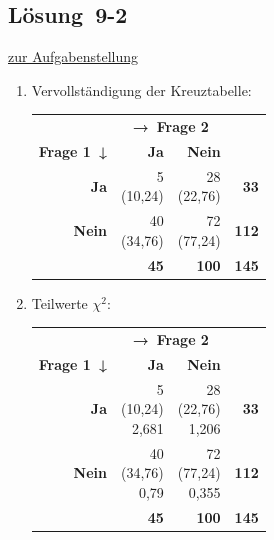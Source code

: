 \documentclass[
  11pt,
  ngerman,
  a4paper,
]{report}
\begin{document}
\hypertarget{loesung-9-2}{%
\subsection{Lösung~9-2}\label{loesung-9-2}}

\protect\hyperlink{aufgabe-9-2}{zur Aufgabenstellung}

\begin{enumerate}
\def\labelenumi{\alph{enumi})}
\item
  Vervollständigung der Kreuztabelle:

  \begin{table}[H]
   \centering
   \begin{tabular}{>{}r|r>{}r|>{}r}
   \toprule
   \multicolumn{1}{c}{\textbf{ }} & \multicolumn{2}{c}{\textbf{→ Frage 2}} & \multicolumn{1}{c}{\textbf{ }} \\
   \cmidrule(l{3pt}r{3pt}){2-3}
   \textbf{Frage 1 ↓} & \textbf{Ja} & \textbf{Nein} & \textbf{  }\\
   \midrule
   \textbf{Ja} & \makecell[tr]{5\\(10,24)} & \makecell[tr]{28\\(22,76)} & \textbf{33}\\
   \textbf{Nein} & \makecell[tr]{40\\(34,76)} & \makecell[tr]{72\\(77,24)} & \textbf{112}\\
   \midrule
   \textbf{\textbf{}} & \textbf{45} & \textbf{100} & \textbf{\textbf{145}}\\
   \bottomrule
   \end{tabular}
   \end{table}
\item
  Teilwerte \(\chi^2\):

  \begin{table}[H]
   \centering
   \begin{tabular}{>{}r|r>{}r|>{}r}
   \toprule
   \multicolumn{1}{c}{\textbf{ }} & \multicolumn{2}{c}{\textbf{→ Frage 2}} & \multicolumn{1}{c}{\textbf{ }} \\
   \cmidrule(l{3pt}r{3pt}){2-3}
   \textbf{Frage 1 ↓} & \textbf{Ja} & \textbf{Nein} & \textbf{  }\\
   \midrule
   \textbf{Ja} & \makecell[tr]{5\\(10,24)\\\textcolor{goethe_blue}{2,681}} & \makecell[tr]{28\\(22,76)\\\textcolor{goethe_blue}{1,206}} & \textbf{33}\\
   \textbf{Nein} & \makecell[tr]{40\\(34,76)\\\textcolor{goethe_blue}{0,79}} & \makecell[tr]{72\\(77,24)\\\textcolor{goethe_blue}{0,355}} & \textbf{112}\\
   \midrule
   \textbf{\textbf{}} & \textbf{45} & \textbf{100} & \textbf{\textbf{145}}\\
   \bottomrule
   \end{tabular}
   \end{table}


\end{enumerate}
\end{document}
